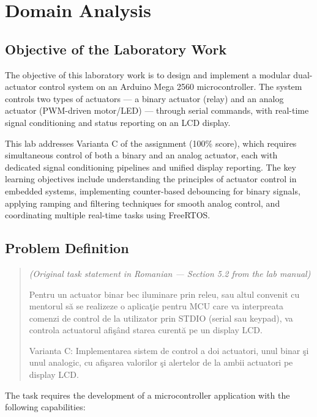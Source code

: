 \section{Domain Analysis}

\subsection{Objective of the Laboratory Work}

The objective of this laboratory work is to design and implement a modular dual-actuator control system on an Arduino Mega 2560 microcontroller. The system controls two types of actuators --- a binary actuator (relay) and an analog actuator (PWM-driven motor/LED) --- through serial commands, with real-time signal conditioning and status reporting on an LCD display.

This lab addresses Varianta C of the assignment (100\% score), which requires simultaneous control of both a binary and an analog actuator, each with dedicated signal conditioning pipelines and unified display reporting. The key learning objectives include understanding the principles of actuator control in embedded systems, implementing counter-based debouncing for binary signals, applying ramping and filtering techniques for smooth analog control, and coordinating multiple real-time tasks using FreeRTOS.

\subsection{Problem Definition}

\begin{quote}
\textit{(Original task statement in Romanian --- Section 5.2 from the lab manual)}

Pentru un actuator binar bec iluminare prin releu, sau altul convenit cu mentorul s\u{a} se realizeze o aplica\c{t}ie pentru MCU care va interpreata comenzi de control de la utilizator prin STDIO (serial sau keypad), va controla actuatorul afi\c{s}\^{a}nd starea curent\u{a} pe un display LCD.

Varianta C: Implementarea sistem de control a doi actuatori, unul binar \c{s}i unul analogic, cu afi\c{s}area valorilor \c{s}i alertelor de la ambii actuatori pe display LCD.
\end{quote}

The task requires the development of a microcontroller application with the following capabilities:

